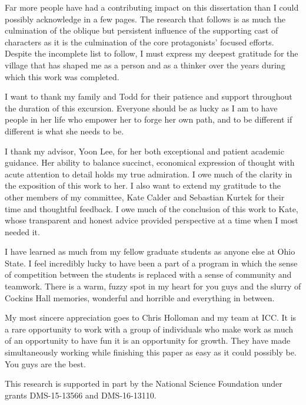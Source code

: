 \begin{acknowledgements}

Far more people have had a contributing impact on this dissertation than I could possibly acknowledge in a few pages. The research that follows is as much the culmination of the oblique but persistent influence of the supporting cast of characters as it is the culmination of the core protagonists' focused efforts. Despite the incomplete list to follow, I must express my deepest gratitude for the village that has shaped me as a person and as a thinker over the years during which this work was completed. 

\bigskip

I want to thank my family and Todd for their patience and support throughout the duration of this excursion. Everyone should be as lucky as I am to have people in her life who empower her to forge her own path, and to be different if different is what she needs to be. 

\bigskip
 
I thank my advisor, Yoon Lee, for her both exceptional and patient academic guidance. Her ability to balance succinct, economical expression of thought with acute attention to detail holds my true admiration. I owe much of the clarity in the exposition of this work to her. I also want to extend my gratitude to the other members of my committee, Kate Calder and Sebastian Kurtek for their time and thoughtful feedback. I owe much of the conclusion of this work to Kate, whose transparent and honest advice provided perspective at a time when I most needed it. 

\bigskip

I have learned as much from my fellow graduate students as anyone else at Ohio State. I feel incredibly lucky to have been a part of a program in which the sense of competition between the students is replaced with a sense of community and teamwork. There is a warm, fuzzy spot in my heart for you guys and the slurry of Cockins Hall memories, wonderful and horrible and everything in between. 

\bigskip

My most sincere appreciation goes to Chris Holloman and my team at ICC. It is a rare opportunity to work with a group of individuals who make work as much of an opportunity to have fun it is an opportunity for growth. They have made simultaneously working while finishing this paper as easy as it could possibly be. You guys are the best.

\bigskip

This research is supported in part by the National Science Foundation under grants DMS-15-13566 and DMS-16-13110. 

\end{acknowledgements}

